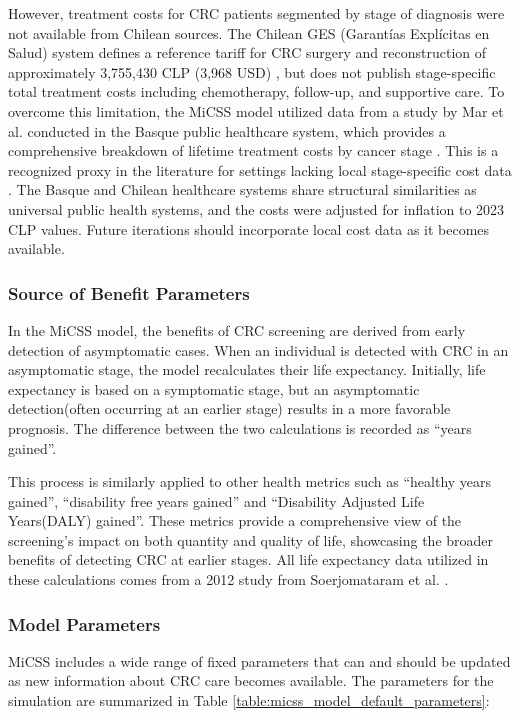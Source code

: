 \documentclass[sn-mathphys-num]{sn-jnl}%
\theoremstyle{thmstyleone}%
\theoremstyle{thmstyletwo}%
\theoremstyle{thmstylethree}%
\begin{document}
However, treatment costs for CRC patients segmented by stage of diagnosis were not available from Chilean sources. The Chilean GES (Garant\'ias Expl\'icitas en Salud) system defines a reference tariff for CRC surgery and reconstruction of approximately 3,755,430 CLP (3,968 USD) \cite{noauthor_superintendencia_2024}, but does not publish stage-specific total treatment costs including chemotherapy, follow-up, and supportive care. To overcome this limitation, the MiCSS model utilized data from a study by Mar et al. conducted in the Basque public healthcare system, which provides a comprehensive breakdown of lifetime treatment costs by cancer stage \cite{mar_cost_2017}. This is a recognized proxy in the literature for settings lacking local stage-specific cost data \cite{luengo-fernandez_economic_2013}. The Basque and Chilean healthcare systems share structural similarities as universal public health systems, and the costs were adjusted for inflation to 2023 CLP values. Future iterations should incorporate local cost data as it becomes available.

\subsubsection{Source of Benefit Parameters}

In the MiCSS model, the benefits of CRC screening are derived from early detection of asymptomatic cases. When an individual is detected with CRC in an asymptomatic stage, the model recalculates their life expectancy. Initially, life expectancy is based on a symptomatic stage, but an asymptomatic detection(often occurring at an earlier stage) results in a more favorable prognosis. The difference between the two calculations is recorded as ``years gained''. 

This process is similarly applied to other health metrics such as ``healthy years gained'', ``disability free years gained'' and ``Disability Adjusted Life Years(DALY) gained''. These metrics provide a comprehensive view of the screening's impact on both quantity and quality of life, showcasing the broader benefits of detecting CRC at earlier stages. All life expectancy data utilized in these calculations comes from a 2012 study from Soerjomataram et al. \cite{soerjomataram_most_2012}.

\newpage
\subsubsection{Model Parameters}
MiCSS includes a wide range of fixed parameters that can and should be updated as new information about CRC care becomes available. The parameters for the simulation are summarized in Table \ref{table:micss_model_default_parameters}:
\end{document}
